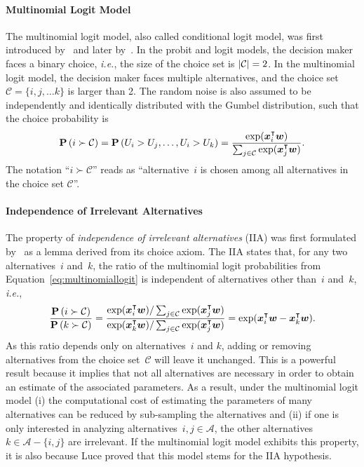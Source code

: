 \paragraph{Multinomial Logit Model}

The multinomial logit model, also called conditional logit model, was first introduced by~\citet{luce1959individual} and later by~\citet{mcfadden1973conditional}.
In the probit and logit models, the decision maker faces a binary choice, \textit{i.e.}, the size of the choice set is $\lvert\mathcal{C}\rvert = 2$.
In the multinomial logit model, the decision maker faces multiple alternatives, and the choice set $\mathcal{C} = \{ i, j, \ldots k \}$ is larger than 2.
The random noise is also assumed to be independently and identically distributed with the Gumbel distribution, such that the choice probability is
\begin{equation}
	\label{eq:multinomiallogit}
	\mathbf{P}\left( i \succ \mathcal{C} \right) = \mathbf{P}\left( U_i > U_j, \ldots, U_i > U_k \right) = \frac{\exp(\bm{x}_i^\intercal \bm{w})}{\sum_{j \in \mathcal{C}} \exp(\bm{x}_j^\intercal \bm{w})}.
\end{equation}
The notation ``$i \succ \mathcal{C}$'' reads as ``alternative~$i$ is chosen among all alternatives in the choice set $\mathcal{C}$''.

\paragraph{Independence of Irrelevant Alternatives}

The property of \emph{independence of irrelevant alternatives} (IIA) was first formulated by~\citet{luce1959individual} as a lemma derived from its choice axiom.
The IIA states that, for any two alternatives~$i$ and~$k$, the ratio of the multinomial logit probabilities from Equation~\ref{eq:multinomiallogit} is independent of alternatives other than~$i$ and~$k$, \textit{i.e.},
\begin{equation}
	\frac{\mathbf{P}\left( i \succ \mathcal{C} \right)}{\mathbf{P}\left( k \succ \mathcal{C} \right)}
	= \frac{\exp(\bm{x}_i^\intercal \bm{w}) / \sum_{j \in \mathcal{C}} \exp(\bm{x}_j^\intercal \bm{w})}{\exp(\bm{x}_k^\intercal \bm{w}) / \sum_{j \in \mathcal{C}} \exp(\bm{x}_j^\intercal \bm{w})}
	= \exp(\bm{x}_i^\intercal \bm{w} - \bm{x}_k^\intercal \bm{w}).
\end{equation}
As this ratio depends only on alternatives~$i$ and $k$, adding or removing alternatives from the choice set~$\mathcal{C}$ will leave it unchanged.
This is a powerful result because it implies that not all alternatives are necessary in order to obtain an estimate of the associated parameters.
As a result, under the multinomial logit model (i) the computational cost of estimating the parameters of many alternatives can be reduced by sub-sampling the alternatives and (ii) if one is only interested in analyzing alternatives~$i,j \in \mathcal{A}$, the other alternatives~$k \in \mathcal{A} - \{i, j\}$ are irrelevant.
If the multinomial logit model exhibits this property, it is also because Luce proved that this model stems for the IIA hypothesis.

